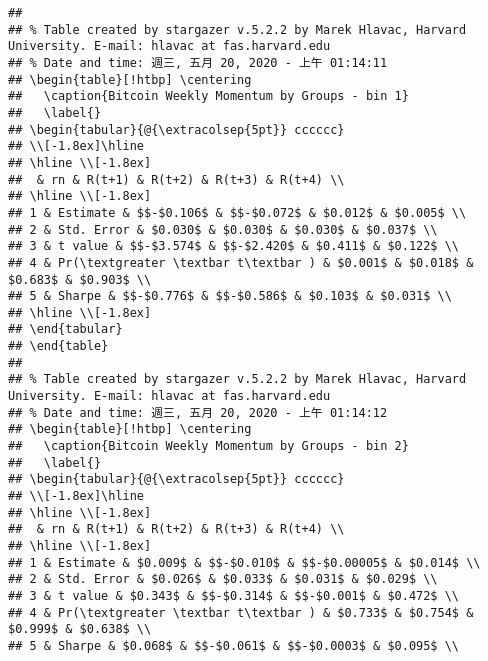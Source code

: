 \documentclass[
]{article}
\begin{document}
\begin{verbatim}
## 
## % Table created by stargazer v.5.2.2 by Marek Hlavac, Harvard University. E-mail: hlavac at fas.harvard.edu
## % Date and time: 週三, 五月 20, 2020 - 上午 01:14:11
## \begin{table}[!htbp] \centering 
##   \caption{Bitcoin Weekly Momentum by Groups - bin 1} 
##   \label{} 
## \begin{tabular}{@{\extracolsep{5pt}} cccccc} 
## \\[-1.8ex]\hline 
## \hline \\[-1.8ex] 
##  & rn & R(t+1) & R(t+2) & R(t+3) & R(t+4) \\ 
## \hline \\[-1.8ex] 
## 1 & Estimate & $$-$0.106$ & $$-$0.072$ & $0.012$ & $0.005$ \\ 
## 2 & Std. Error & $0.030$ & $0.030$ & $0.030$ & $0.037$ \\ 
## 3 & t value & $$-$3.574$ & $$-$2.420$ & $0.411$ & $0.122$ \\ 
## 4 & Pr(\textgreater \textbar t\textbar ) & $0.001$ & $0.018$ & $0.683$ & $0.903$ \\ 
## 5 & Sharpe & $$-$0.776$ & $$-$0.586$ & $0.103$ & $0.031$ \\ 
## \hline \\[-1.8ex] 
## \end{tabular} 
## \end{table} 
## 
## % Table created by stargazer v.5.2.2 by Marek Hlavac, Harvard University. E-mail: hlavac at fas.harvard.edu
## % Date and time: 週三, 五月 20, 2020 - 上午 01:14:12
## \begin{table}[!htbp] \centering 
##   \caption{Bitcoin Weekly Momentum by Groups - bin 2} 
##   \label{} 
## \begin{tabular}{@{\extracolsep{5pt}} cccccc} 
## \\[-1.8ex]\hline 
## \hline \\[-1.8ex] 
##  & rn & R(t+1) & R(t+2) & R(t+3) & R(t+4) \\ 
## \hline \\[-1.8ex] 
## 1 & Estimate & $0.009$ & $$-$0.010$ & $$-$0.00005$ & $0.014$ \\ 
## 2 & Std. Error & $0.026$ & $0.033$ & $0.031$ & $0.029$ \\ 
## 3 & t value & $0.343$ & $$-$0.314$ & $$-$0.001$ & $0.472$ \\ 
## 4 & Pr(\textgreater \textbar t\textbar ) & $0.733$ & $0.754$ & $0.999$ & $0.638$ \\ 
## 5 & Sharpe & $0.068$ & $$-$0.061$ & $$-$0.0003$ & $0.095$ \\ 

\end{verbatim}
\end{document}
